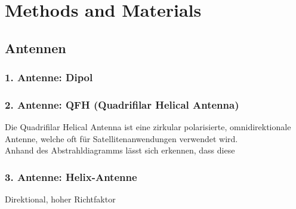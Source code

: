 \chapter{Methods and Materials}
\label{chap:methods}

\hspace{0pt}
\vfill
\section{Antennen}
\subsection{1. Antenne: Dipol}

\subsection{2. Antenne: QFH (Quadrifilar Helical Antenna)}
Die Quadrifilar Helical Antenna ist eine zirkular polarisierte, omnidirektionale Antenne, welche oft für Satellitenanwendungen verwendet wird.\\

Anhand des Abstrahldiagramms lässt sich erkennen, dass diese 

\subsection{3. Antenne: Helix-Antenne}
Direktional, hoher Richtfaktor

\vfill
\hspace{0pt}